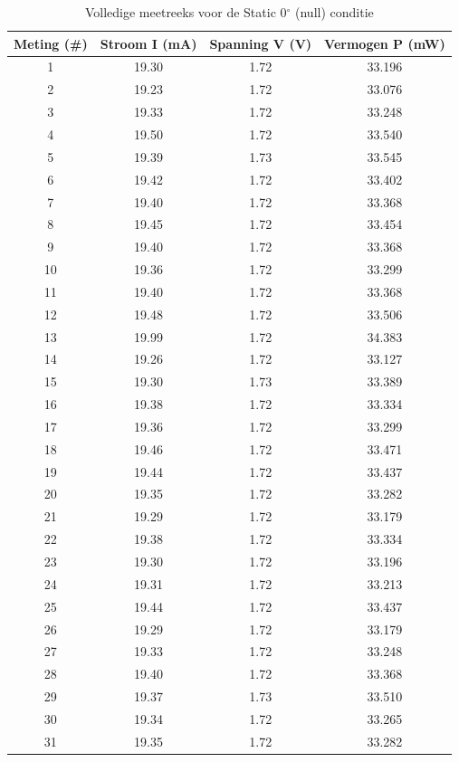 \begin{table}[htbp]
\centering
\caption{Volledige meetreeks voor de Static 0$^\circ$ (null) conditie}
\label{tab:static_0deg_data}
\begin{tabular}{c S[table-format=2.2] S[table-format=1.2] S[table-format=2.3]}
\toprule
\textbf{Meting (\#)} & {\textbf{Stroom I (mA)}} & {\textbf{Spanning V (V)}} & {\textbf{Vermogen P (mW)}} \\
  & 19.30 & 1.72 & 33.196 \\
2  & 19.23 & 1.72 & 33.076 \\
3  & 19.33 & 1.72 & 33.248 \\
4  & 19.50 & 1.72 & 33.540 \\
5  & 19.39 & 1.73 & 33.545 \\
6  & 19.42 & 1.72 & 33.402 \\
7  & 19.40 & 1.72 & 33.368 \\
8  & 19.45 & 1.72 & 33.454 \\
9  & 19.40 & 1.72 & 33.368 \\
10 & 19.36 & 1.72 & 33.299 \\
11 & 19.40 & 1.72 & 33.368 \\
12 & 19.48 & 1.72 & 33.506 \\
13 & 19.99 & 1.72 & 34.383 \\
14 & 19.26 & 1.72 & 33.127 \\
15 & 19.30 & 1.73 & 33.389 \\
16 & 19.38 & 1.72 & 33.334 \\
17 & 19.36 & 1.72 & 33.299 \\
18 & 19.46 & 1.72 & 33.471 \\
19 & 19.44 & 1.72 & 33.437 \\
20 & 19.35 & 1.72 & 33.282 \\
21 & 19.29 & 1.72 & 33.179 \\
22 & 19.38 & 1.72 & 33.334 \\
23 & 19.30 & 1.72 & 33.196 \\
24 & 19.31 & 1.72 & 33.213 \\
25 & 19.44 & 1.72 & 33.437 \\
26 & 19.29 & 1.72 & 33.179 \\
27 & 19.33 & 1.72 & 33.248 \\
28 & 19.40 & 1.72 & 33.368 \\
29 & 19.37 & 1.73 & 33.510 \\
30 & 19.34 & 1.72 & 33.265 \\
31 & 19.35 & 1.72 & 33.282 \\

\end{tabular}
\end{table}
